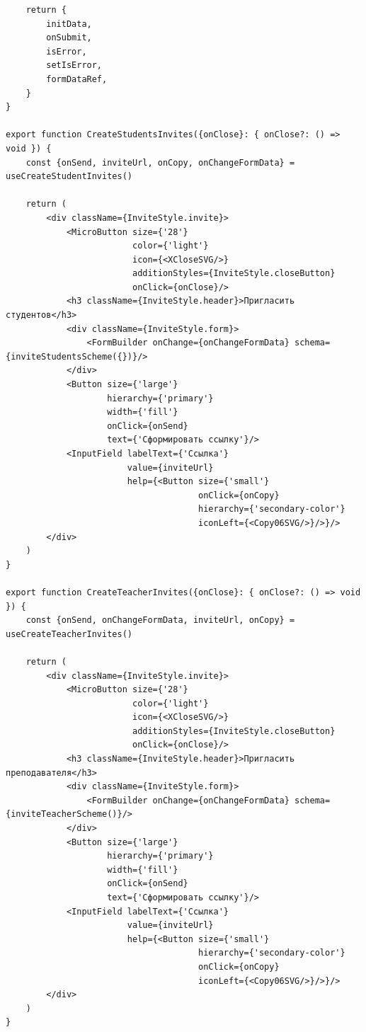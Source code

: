 \begin{lstlisting}
    return {
        initData,
        onSubmit,
        isError,
        setIsError,
        formDataRef,
    }
}

export function CreateStudentsInvites({onClose}: { onClose?: () => void }) {
    const {onSend, inviteUrl, onCopy, onChangeFormData} = useCreateStudentInvites()

    return (
        <div className={InviteStyle.invite}>
            <MicroButton size={'28'}
                         color={'light'}
                         icon={<XCloseSVG/>}
                         additionStyles={InviteStyle.closeButton}
                         onClick={onClose}/>
            <h3 className={InviteStyle.header}>Пригласить студентов</h3>
            <div className={InviteStyle.form}>
                <FormBuilder onChange={onChangeFormData} schema={inviteStudentsScheme({})}/>
            </div>
            <Button size={'large'}
                    hierarchy={'primary'}
                    width={'fill'}
                    onClick={onSend}
                    text={'Сформировать ссылку'}/>
            <InputField labelText={'Ссылка'}
                        value={inviteUrl}
                        help={<Button size={'small'}
                                      onClick={onCopy}
                                      hierarchy={'secondary-color'}
                                      iconLeft={<Copy06SVG/>}/>}/>
        </div>
    )
}

export function CreateTeacherInvites({onClose}: { onClose?: () => void }) {
    const {onSend, onChangeFormData, inviteUrl, onCopy} = useCreateTeacherInvites()

    return (
        <div className={InviteStyle.invite}>
            <MicroButton size={'28'}
                         color={'light'}
                         icon={<XCloseSVG/>}
                         additionStyles={InviteStyle.closeButton}
                         onClick={onClose}/>
            <h3 className={InviteStyle.header}>Пригласить преподавателя</h3>
            <div className={InviteStyle.form}>
                <FormBuilder onChange={onChangeFormData} schema={inviteTeacherScheme()}/>
            </div>
            <Button size={'large'}
                    hierarchy={'primary'}
                    width={'fill'}
                    onClick={onSend}
                    text={'Сформировать ссылку'}/>
            <InputField labelText={'Ссылка'}
                        value={inviteUrl}
                        help={<Button size={'small'}
                                      hierarchy={'secondary-color'}
                                      onClick={onCopy}
                                      iconLeft={<Copy06SVG/>}/>}/>
        </div>
    )
}


\end{lstlisting}
